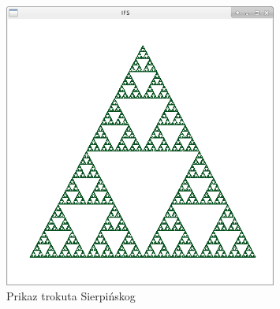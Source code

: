 \documentclass[a4paper,12pt]{article}
\begin{document}
\begin{figure}[H]
  \centering
  \includegraphics[width=0.8\textwidth]{img/sierpinski.png}
  \caption{Prikaz trokuta Sierpi{\'n}skog}
  \label{fig:sierpinski}
\end{figure}
\end{document}
